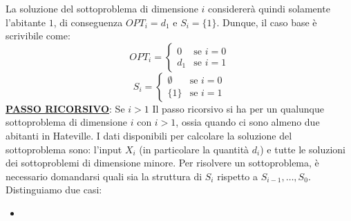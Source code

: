 \documentclass[12pt]{article}
\begin{document}
La soluzione del sottoproblema di dimensione $i$ considererà quindi solamente l'abitante $1$, di conseguenza $OPT_i = d_1$ e $S_i = \{1\}$. Dunque, il caso base è scrivibile come:
\begin{equation*}
    OPT_i = \begin{cases}
        0 & \textrm{se } i = 0 \\
        d_1 & \textrm{se } i = 1
    \end{cases}
\end{equation*}
\begin{equation*}
    S_i = \begin{cases}
        \emptyset & \textrm{se } i = 0 \\
        \{1\} & \textrm{se } i = 1
    \end{cases}
\end{equation*}
\textbf{\underline{PASSO RICORSIVO}}: Se $i > 1$ \newline
Il passo ricorsivo si ha per un qualunque sottoproblema di dimensione $i$ con $i > 1$, ossia quando ci sono almeno due abitanti in Hateville.
I dati disponibili per calcolare la soluzione del sottoproblema sono: l'input $X_i$ (in particolare la quantità $d_i$) e tutte le soluzioni dei sottoproblemi di dimensione minore.
Per risolvere un sottoproblema, è necessario domandarsi quali sia la struttura di $S_i$ rispetto a $S_{i-1}, \dots, S_0$. Distinguiamo due casi:
\begin{itemize}
    \item 
\end{itemize}
\end{document}
